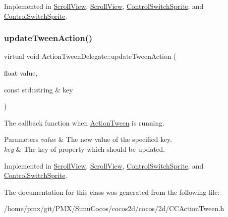 Implemented in \hyperlink{classScrollView_a0af7498e959826dad2ae4d66f1b5b71d}{Scroll\+View}, \hyperlink{classScrollView_a0af7498e959826dad2ae4d66f1b5b71d}{Scroll\+View}, \hyperlink{classControlSwitchSprite_ad8a83b2b2fdf822e067ade20df0df786}{Control\+Switch\+Sprite}, and \hyperlink{classControlSwitchSprite_a084b47aa783c1e03e14a87f73ae511b3}{Control\+Switch\+Sprite}.

\mbox{\label{classActionTweenDelegate_a6cb6dce375e29bd38af1a81001eeac66}} 
\subsubsection{\texorpdfstring{update\+Tween\+Action()}{updateTweenAction()}\hspace{0.1cm}{\footnotesize\ttfamily [2/2]}}
{\footnotesize\ttfamily virtual void Action\+Tween\+Delegate\+::update\+Tween\+Action (\begin{DoxyParamCaption}\item[{float}]{value,  }\item[{const std\+::string \&}]{key }\end{DoxyParamCaption})\hspace{0.3cm}{\ttfamily [pure virtual]}}



The callback function when \hyperlink{classActionTween}{Action\+Tween} is running. 


\begin{DoxyParams}{Parameters}
{\em value} & The new value of the specified key. \\
\hline
{\em key} & The key of property which should be updated. \\
\hline
\end{DoxyParams}


Implemented in \hyperlink{classScrollView_a0af7498e959826dad2ae4d66f1b5b71d}{Scroll\+View}, \hyperlink{classScrollView_a0af7498e959826dad2ae4d66f1b5b71d}{Scroll\+View}, \hyperlink{classControlSwitchSprite_ad8a83b2b2fdf822e067ade20df0df786}{Control\+Switch\+Sprite}, and \hyperlink{classControlSwitchSprite_a084b47aa783c1e03e14a87f73ae511b3}{Control\+Switch\+Sprite}.



The documentation for this class was generated from the following file\+:\begin{DoxyCompactItemize}
\item 
/home/pmx/git/\+P\+M\+X/\+Simu\+Cocos/cocos2d/cocos/2d/C\+C\+Action\+Tween.\+h\end{DoxyCompactItemize}
